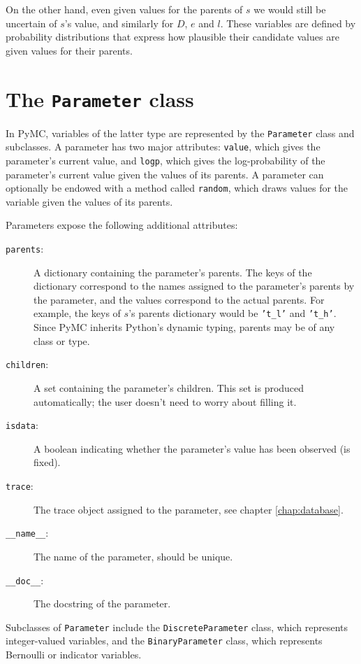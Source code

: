 On the other hand, even given values for the parents of $s$ we would still be uncertain of $s$'s value, and similarly for $D$, $e$ and $l$. These variables are defined by probability distributions that express how plausible their candidate values are given values for their parents.
 

\section{The \texttt{Parameter} class}

In PyMC, variables of the latter type are represented by the \texttt{Parameter} class and subclasses. A parameter has two major attributes: \texttt{value}, which gives the parameter's current value, and \texttt{logp}, which gives the log-probability of the parameter's current value given the values of its parents. A parameter can optionally be endowed with a method called \texttt{random}, which draws values for the variable given the values of its parents.

Parameters expose the following additional attributes:
\begin{description}
    \item[\texttt{parents}:] A dictionary containing the parameter's parents. The keys of the dictionary correspond to the names assigned to the parameter's parents by the parameter, and the values correspond to the actual parents. For example, the keys of $s$'s parents dictionary would be \texttt{'t\_l'} and \texttt{'t\_h'}. Since PyMC inherits Python's dynamic typing, parents may be of any class or type.
    \item[\texttt{children}:] A set containing the parameter's children. This set is produced automatically; the user doesn't need to worry about filling it.
    \item[\texttt{isdata}:] A boolean indicating whether the parameter's value has been observed (is fixed).
    \item[\texttt{trace}:] The trace object assigned to the parameter, see chapter \ref{chap:database}.
    \item[\texttt{\_\_name\_\_}:] The name of the parameter, should be unique.
    \item[\texttt{\_\_doc\_\_}:] The docstring of the parameter.
\end{description}

Subclasses of \texttt{Parameter} include the \texttt{DiscreteParameter} class, which represents integer-valued variables, and the \texttt{BinaryParameter} class, which represents Bernoulli or indicator variables. 

